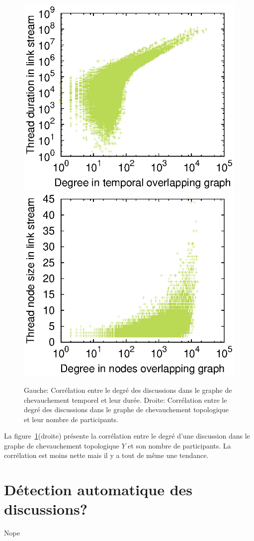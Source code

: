 \begin{figure}
\centering
	\includegraphics[width=0.49\linewidth]{img/mailing/degree_temp}
	\hfill
	\includegraphics[width=0.49\linewidth]{img/mailing/degree_nodes}
	\caption{Gauche: Corrélation entre le degré des discussions dans le graphe de chevauchement temporel et leur durée. Droite: Corrélation entre le degré des discussions dans le graphe de chevauchement topologique et leur nombre de participants.}
	\label{fig:x-y-graphs_discu}
\end{figure}

La figure~\ref{fig:x-y-graphs_discu}(droite) présente la corrélation entre le degré d'une discussion dans le graphe de chevauchement topologique $Y$ et son nombre de participants.
La corrélation est moins nette mais il y a tout de même une tendance.



\section{Détection automatique des discussions?}

Nope